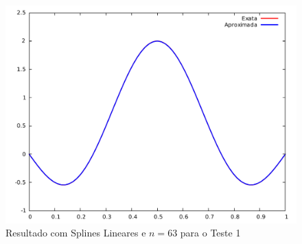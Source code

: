 \documentclass[12pt,a4paper]{report}
\begin{document}
\begin{figure}[h!]
\centering
\includegraphics[width=0.8\linewidth]{splin63.pdf}
\caption{\label{splin}Resultado com Splines Lineares e $n=63$ para o Teste 1}
\end{figure}
\end{document}

